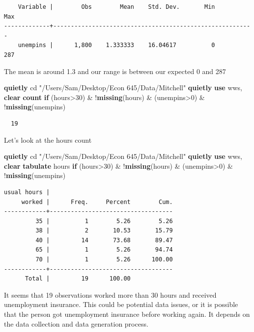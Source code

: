\documentclass[
]{book}
\newenvironment{Shaded}{\begin{snugshade}}{\end{snugshade}}
\newcommand{\FunctionTok}[1]{\textcolor[rgb]{0.13,0.29,0.53}{\textbf{#1}}}
\newcommand{\KeywordTok}[1]{\textcolor[rgb]{0.13,0.29,0.53}{\textbf{#1}}}
\newcommand{\NormalTok}[1]{#1}
\newcommand{\StringTok}[1]{\textcolor[rgb]{0.31,0.60,0.02}{#1}}
\begin{document}
\begin{verbatim}
    Variable |        Obs        Mean    Std. Dev.       Min        Max
-------------+---------------------------------------------------------
    unempins |      1,800    1.333333    16.04617          0        287
\end{verbatim}

The mean is around 1.3 and our range is between our expected 0 and 287

\begin{Shaded}
\begin{Highlighting}[]
\KeywordTok{quietly}\NormalTok{ cd }\StringTok{"/Users/Sam/Desktop/Econ 645/Data/Mitchell"}
\KeywordTok{quietly} \KeywordTok{use}\NormalTok{ wws, }\KeywordTok{clear}
\FunctionTok{count} \KeywordTok{if}\NormalTok{ (hours\textgreater{}30) \& !}\FunctionTok{missing}\NormalTok{(hours) \& (unempins\textgreater{}0) \& !}\FunctionTok{missing}\NormalTok{(unempins)}
\end{Highlighting}
\end{Shaded}

\begin{verbatim}
  19
\end{verbatim}

Let's look at the hours count

\begin{Shaded}
\begin{Highlighting}[]
\KeywordTok{quietly}\NormalTok{ cd }\StringTok{"/Users/Sam/Desktop/Econ 645/Data/Mitchell"}
\KeywordTok{quietly} \KeywordTok{use}\NormalTok{ wws, }\KeywordTok{clear}
\KeywordTok{tabulate}\NormalTok{ hours }\KeywordTok{if}\NormalTok{ (hours\textgreater{}30) \& !}\FunctionTok{missing}\NormalTok{(hours) \& (unempins\textgreater{}0) \& !}\FunctionTok{missing}\NormalTok{(unempins)}
\end{Highlighting}
\end{Shaded}

\begin{verbatim}
usual hours |
     worked |      Freq.     Percent        Cum.
------------+-----------------------------------
         35 |          1        5.26        5.26
         38 |          2       10.53       15.79
         40 |         14       73.68       89.47
         65 |          1        5.26       94.74
         70 |          1        5.26      100.00
------------+-----------------------------------
      Total |         19      100.00
\end{verbatim}

It seems that 19 observations worked more than 30 hours and received unemployment insurance. This could be potential data issues, or it is possible that the person got unemployment insurance before working again. It depends on the data collection and data generation process.
\end{document}
